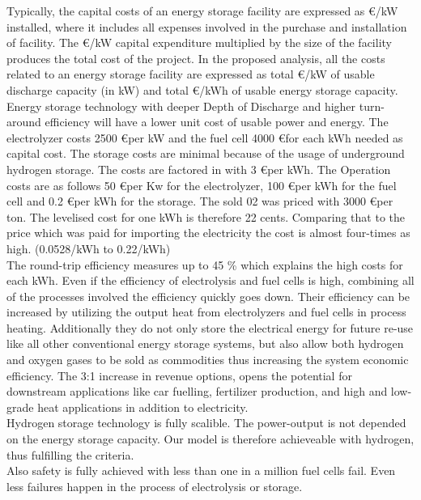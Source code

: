 \documentclass[12pt,a4paper]{article}
\begin{document}
\begin{parcolumns}[colwidths={1=2.5 cm, 2=10 cm, 3=2.5cm}]{3}
{Typically, the capital costs of an energy storage facility are expressed as \euro /kW installed, where it includes all expenses involved in the purchase and installation of facility. The \euro /kW capital expenditure multiplied by the size of the facility produces the total cost of the project. In the proposed analysis, all the costs related to an energy storage facility are expressed as total \euro /kW of usable discharge capacity (in kW) and total \euro /kWh of usable energy storage capacity. Energy storage technology with deeper Depth of Discharge and higher turn-around efficiency will have a lower unit cost of usable power and energy. The electrolyzer costs 2500 \euro per kW and the fuel cell 4000 \euro for each kWh needed as capital cost. The storage costs are minimal because of the usage of underground hydrogen storage. The costs are factored in with 3 \euro per kWh.  The Operation costs are as follows 50 \euro per Kw for the electrolyzer, 100 \euro per kWh for the fuel cell and 0.2 \euro per kWh for the storage. The sold 02 was priced with 3000 \euro per ton.  The levelised cost for one kWh is therefore 22 cents. Comparing that to the price which was paid for importing the electricity the cost is almost four-times as high. (0.0528/kWh to 0.22/kWh) \\

The round-trip efficiency measures up to 45 \% which explains the high costs for each kWh. Even if the efficiency of electrolysis and fuel cells is high, combining all of the processes involved the efficiency quickly goes down.  Their efficiency can be increased by utilizing the output heat from electrolyzers and fuel cells in process heating. Additionally they do not only store the electrical energy for future re-use like all other conventional energy storage systems, but also allow both hydrogen and oxygen gases to be sold as commodities thus increasing the system economic efficiency. The 3:1 increase in revenue options, opens the potential for downstream
applications like car fuelling, fertilizer production, and high and low-grade heat applications in addition to electricity. \\

Hydrogen storage technology is fully scalible. The power-output is not depended on the energy storage capacity. Our model is therefore achieveable with hydrogen, thus fulfilling the criteria. \\

Also safety is fully achieved with less than one in a million fuel cells fail. Even less failures happen in the process of electrolysis or storage. \\

}
\end{parcolumns}
\end{document}
